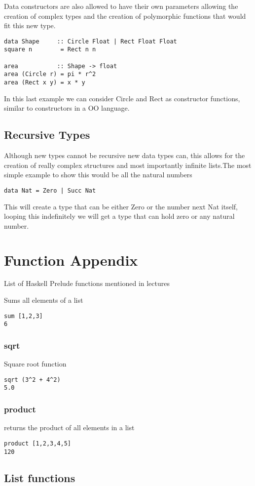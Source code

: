 \documentclass[12pt, oneside]{article}
\begin{document}
Data constructors are also allowed to have their own parameters allowing the creation of complex types and the creation of polymorphic functions that would fit this new type.
\begin{lstlisting}
data Shape     :: Circle Float | Rect Float Float
square n        = Rect n n

area           :: Shape -> float
area (Circle r) = pi * r^2
area (Rect x y) = x * y
\end{lstlisting}
In this last example we can consider Circle and Rect as constructor functions, similar to constructors in a OO language.

\subsection{Recursive Types}
Although new types cannot be recursive new data types can, this allows for the creation of really complex structures and most importantly infinite lists.The most simple example to show this would be all the natural numbers
\begin{lstlisting}
data Nat = Zero | Succ Nat
\end{lstlisting}
This will create a type that can be either Zero or the number next Nat itself, looping this indefinitely we will get a type that can hold zero or any natural number.

\section{Function Appendix}
List of Haskell Prelude functions mentioned in lectures

Sums all elements of a list
\begin{lstlisting}
sum [1,2,3]
6
\end{lstlisting}
\subsubsection{sqrt}
Square root function
\begin{lstlisting}
sqrt (3^2 + 4^2)
5.0
\end{lstlisting}
\subsubsection{product}
returns the product of all elements in a list
\begin{lstlisting}
product [1,2,3,4,5]
120
\end{lstlisting}
\subsection{List functions}
\end{document}
